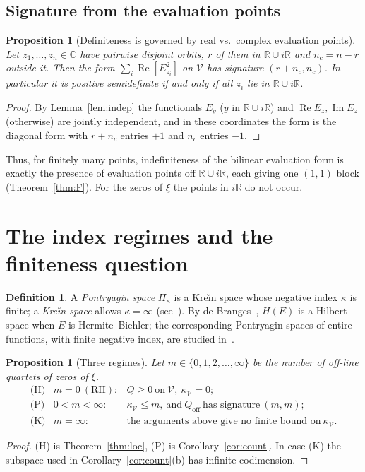 \documentclass[11pt]{amsart}
\newtheorem{proposition}[theorem]{Proposition}
\theoremstyle{definition}
\newtheorem{definition}[theorem]{Definition}
\theoremstyle{remark}
\newcommand{\RH}{\mathrm{RH}}
\renewcommand{\Re}{\operatorname{Re}}
\renewcommand{\Im}{\operatorname{Im}}
\newcommand{\kV}{\kappa_{\mathcal V}}
\begin{document}
\subsection{Signature from the evaluation points}
\begin{proposition}[Definiteness is governed by real vs.\ complex evaluation points]\label{prop:spectrum}
Let $z_1,\dots,z_n\in\mathbb C$ have pairwise disjoint orbits, $r$ of them in $\mathbb R\cup
i\mathbb R$ and $n_c=n-r$ outside it. Then the form $\sum_i\Re[E_{z_i}^2]$ on $\mathcal V$ has
signature $(r+n_c,n_c)$. In particular it is positive semidefinite if and only if all $z_i$ lie
in $\mathbb R\cup i\mathbb R$.
\end{proposition}
\begin{proof}
By Lemma~\ref{lem:indep} the functionals $E_{y}$ ($y$ in $\mathbb R\cup i\mathbb R$) and $\Re
E_{z},\Im E_{z}$ (otherwise) are jointly independent, and in these coordinates the form is the
diagonal form with $r+n_c$ entries $+1$ and $n_c$ entries $-1$.
\end{proof}

Thus, for finitely many points, indefiniteness of the bilinear evaluation form is exactly the
presence of evaluation points off $\mathbb R\cup i\mathbb R$, each giving one $(1,1)$ block
(Theorem~\ref{thm:F}). For the zeros of $\xi$ the points in $i\mathbb R$ do not occur.

\section{The index regimes and the finiteness question}\label{sec:regimes}

\begin{definition}
A \emph{Pontryagin space} $\Pi_\kappa$ is a Kre\u\i n space whose negative index $\kappa$ is
finite; a \emph{Kre\u\i n space} allows $\kappa=\infty$ (see~\cite{Bognar,Azizov}). By de
Branges~\cite{deBranges}, $H(E)$ is a Hilbert space when $E$ is Hermite--Biehler; the
corresponding Pontryagin spaces of entire functions, with finite negative index, are studied
in~\cite{KW}.
\end{definition}

\begin{proposition}[Three regimes]\label{prop:regimes}
Let $m\in\{0,1,2,\dots,\infty\}$ be the number of off-line quartets of zeros of $\xi$.
\[
\begin{array}{lll}
\text{(H)} & m=0\ (\RH): & Q\ge0\ \text{on}\ \mathcal V,\ \kV=0;\\
\text{(P)} & 0<m<\infty: & \kV\le m,\ \text{and}\ Q_{\mathrm{off}}\ \text{has signature}\ (m,m);\\
\text{(K)} & m=\infty: & \text{the arguments above give no finite bound on}\ \kV.
\end{array}
\]
\end{proposition}
\begin{proof}
(H) is Theorem~\ref{thm:loc}, (P) is Corollary~\ref{cor:count}. In case (K) the subspace used in
Corollary~\ref{cor:count}(b) has infinite codimension.
\end{proof}
\end{document}
